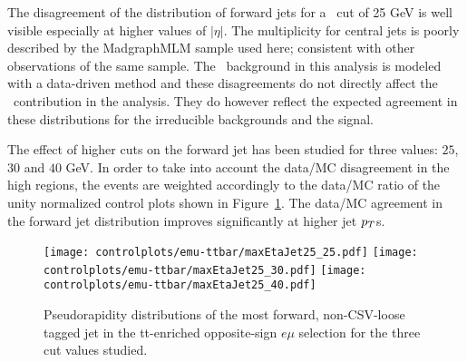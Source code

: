 The disagreement of the \etac distribution of forward jets for a \pt\ cut of 25 GeV is well visible especially at higher values of $|\eta|$. The multiplicity for central jets is poorly described by the MadgraphMLM sample used here; consistent with other observations of the same sample. The \ttbar\ background in this analysis is modeled with a data-driven method and these disagreements do not directly affect the \ttbar\ contribution in the analysis. They do however reflect the expected agreement in these distributions for the irreducible backgrounds and the signal.

The effect of higher \pt cuts on the forward jet has been studied for three values: $25$, $30$ and $40$ GeV. In order to take into account the data/MC disagreement in the high \etac regions, the events are weighted accordingly to the data/MC ratio of the unity normalized control plots shown in Figure~\ref{fig:ptCutVar}. The data/MC agreement in the forward jet \etac distribution improves significantly at higher jet $p_T$s.

\begin{figure} [!h]
  \centering
  \texttt{[image: controlplots/emu-ttbar/maxEtaJet25\_25.pdf]}
  \texttt{[image: controlplots/emu-ttbar/maxEtaJet25\_30.pdf]}
  \texttt{[image: controlplots/emu-ttbar/maxEtaJet25\_40.pdf]}\\
\caption[Most forward jets \etac distributions]{Pseudorapidity distributions of the most forward, non-CSV-loose tagged jet in the tt-enriched opposite-sign $e\mu$ selection for the three \pt cut values studied.}
\label{fig:ptCutVar}
\end{figure}

